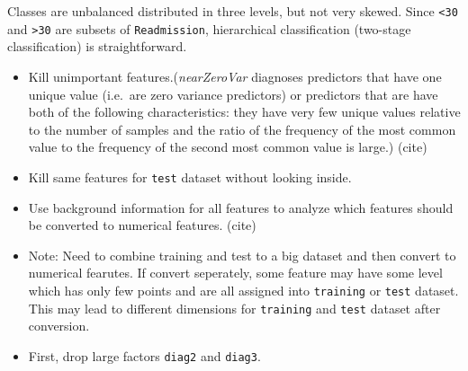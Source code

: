 \documentclass[]{article}
\newenvironment{Shaded}{\begin{snugshade}}{\end{snugshade}}
\newcommand{\KeywordTok}[1]{\textcolor[rgb]{0.13,0.29,0.53}{\textbf{{#1}}}}
\newcommand{\DataTypeTok}[1]{\textcolor[rgb]{0.13,0.29,0.53}{{#1}}}
\newcommand{\DecValTok}[1]{\textcolor[rgb]{0.00,0.00,0.81}{{#1}}}
\newcommand{\StringTok}[1]{\textcolor[rgb]{0.31,0.60,0.02}{{#1}}}
\newcommand{\OtherTok}[1]{\textcolor[rgb]{0.56,0.35,0.01}{{#1}}}
\newcommand{\NormalTok}[1]{{#1}}
\begin{document}
Classes are unbalanced distributed in three levels, but not very skewed.
Since \texttt{\textless{}30} and \texttt{\textgreater{}30} are subsets
of \texttt{Readmission}, hierarchical classification (two-stage
classification) is straightforward.

\begin{itemize}
\itemsep1pt\parskip0pt
\item
  Kill unimportant features.(\emph{nearZeroVar} diagnoses predictors
  that have one unique value (i.e.~are zero variance predictors) or
  predictors that are have both of the following characteristics: they
  have very few unique values relative to the number of samples and the
  ratio of the frequency of the most common value to the frequency of
  the second most common value is large.) (cite)
\end{itemize}

\begin{Shaded}
\end{Shaded}

\begin{itemize}
\itemsep1pt\parskip0pt
\item
  Kill same features for \texttt{test} dataset without looking inside.
\end{itemize}

\begin{Shaded}
\end{Shaded}

\begin{itemize}
\itemsep1pt\parskip0pt
\item
  Use background information for all features to analyze which features
  should be converted to numerical features. (cite)
\item
  Note: Need to combine training and test to a big dataset and then
  convert to numerical fearutes. If convert seperately, some feature may
  have some level which has only few points and are all assigned into
  \texttt{training} or \texttt{test} dataset. This may lead to different
  dimensions for \texttt{training} and \texttt{test} dataset after
  conversion.
\item
  First, drop large factors \texttt{diag2} and \texttt{diag3}.
\end{itemize}
\end{document}

